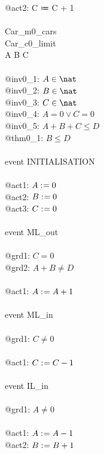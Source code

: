 \begin{description}
\begin{center}
\begin{Bcode}
			@act2: C ≔ C + 1\\
			\Bend\\
			\Bend
			\else
			\Bmachine{} Car\_m0_cars\\
			\Bsees{} Car\_c0_limit\\
			\Bvariables{} A B C\\
			\Binvariants\\
			\Btab @inv0_1: \(A \in \nat\)\\
			\Btab @inv0_2: \(B \in \nat\)\\
			\Btab @inv0_3: \(C \in \nat\)\\
			\Btab @inv0_4: \(A = 0 \vee C = 0\)\\
			\Btab @inv0_5: \(A + B + C \leq D\)\\
			\Btab  \Btheorem{} @thm0_1: \(B \leq D\)\\
			\Bevents\\
			\Btab event INITIALISATION\\
			\Btab \Bthen\\
			\Btab \Btab @act1: \(A \mathrel{:\mkern1mu=} 0\)\\
			\Btab \Btab @act2: \(B \mathrel{:\mkern1mu=} 0\)\\
			\Btab \Btab @act3: \(C \mathrel{:\mkern1mu=} 0\)\\
			\Btab \Bend\\
			\Btab event ML_out\\
			\Btab \Bwhere\\
			\Btab \Btab @grd1: \(C = 0\)\\
			\Btab \Btab @grd2: \(A + B \neq D\)\\
			\Btab \Bthen\\
			\Btab \Btab @act1: \(A \mathrel{:\mkern1mu=} A + 1\)\\
			\Btab \Bend\\
			\Btab event ML_in\\
			\Btab \Bwhere\\
			\Btab \Btab @grd1: \(C \neq 0\)\\
			\Btab \Bthen\\
			\Btab \Btab @act1: \(C \mathrel{:\mkern1mu=} C - 1\)\\
			\Btab \Bend\\
			\Btab event IL_in\\
			\Btab \Bwhere\\
			\Btab \Btab @grd1: \(A \neq 0\)\\
			\Btab \Bthen\\
			\Btab \Btab @act1: \(A \mathrel{:\mkern1mu=} A - 1\)\\
			\Btab \Btab @act2: \(B \mathrel{:\mkern1mu=} B + 1\)\\

\end{Bcode}
\end{center}
\end{description}
